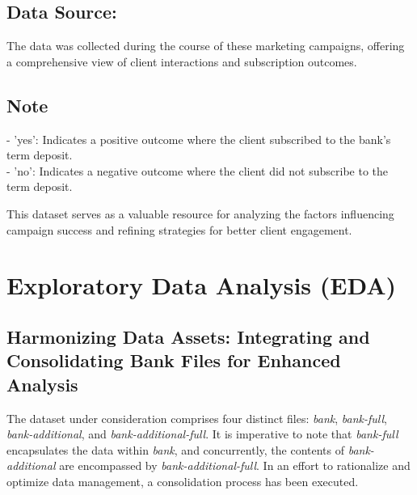 \documentclass{article}
\begin{document}
\subsection{Data Source:}
The data was collected during the course of these marketing campaigns, offering a comprehensive view of client interactions and subscription outcomes.


\subsection{Note}
- 'yes': Indicates a positive outcome where the client subscribed to the bank's term deposit.\\
- 'no': Indicates a negative outcome where the client did not subscribe to the term deposit.

This dataset serves as a valuable resource for analyzing the factors influencing campaign success and refining strategies for better client engagement.

\section{Exploratory Data Analysis (EDA)}

\subsection{Harmonizing Data Assets: Integrating and Consolidating Bank Files for Enhanced Analysis}

The dataset under consideration comprises four distinct files: \textit{bank}, \textit{bank-full}, \textit{bank-additional}, and \textit{bank-additional-full}. It is imperative to note that \textit{bank-full} encapsulates the data within \textit{bank}, and concurrently, the contents of \textit{bank-additional} are encompassed by \textit{bank-additional-full}. In an effort to rationalize and optimize data management, a consolidation process has been executed.
\end{document}
